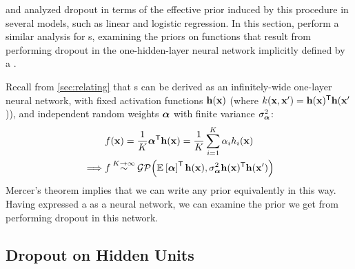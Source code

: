 \citet{baldi2013understanding} and \citet{wang2013fast} analyzed dropout in terms of the effective prior induced by this procedure in several models, such as linear and logistic regression.
In this section, perform a similar analysis for \gp{}s, examining the priors on functions that result from performing dropout in the one-hidden-layer neural network implicitly defined by a \gp{}.

Recall from \cref{sec:relating} that \gp{}s can be derived as an infinitely-wide one-layer neural network, with fixed activation functions ${\bf{h}}({\bf{x}})$ (where $k({\bf{x}}, {\bf{x}}') = {\bf{h}}({\bf{x}})^{\mathsf{T}}{\bf{h}}({\bf{x}}'$)), and independent random weights $\boldsymbol{\alpha}$ with finite variance $\sigma^2_{\boldsymbol{\alpha}}$:
%
\begin{align}
& f({\bf{x}}) = \frac{1}{K}{\mathbf {\boldsymbol{\alpha}}}^{\mathsf{T}} {\bf{h}}({\bf{x}}) = \frac{1}{K} \sum_{i=1}^K \alpha_i h_i({\bf{x}})
\\
\implies & f \mathbin{\overset{K \to \infty}{\sim}} \mathcal{GP}\!\left(\mathbb{E}_{} \left[ {\boldsymbol{\alpha}} \right]^{\mathsf{T}} {\bf{h}}({\bf{x}}),\sigma^2_{\boldsymbol{\alpha}} {\bf{h}}({\bf{x}})^{\mathsf{T}}{\bf{h}}({\bf{x}}')\right)
\label{eq:one-layer-gp-two}
\end{align}
%
Mercer's theorem implies that we can write any \gp{} prior equivalently in this way.
Having expressed a \gp{} as a neural network, we can examine the prior we get from performing dropout in this network.



\subsection{Dropout on Hidden Units}

